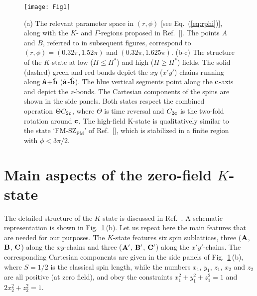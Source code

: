 \documentclass[prx,aps,groupedaddress,twocolumn]{revtex4-1}
\def\cdbl{\color{darkblue}}
\begin{document}
\begin{figure}[!t]
\texttt{[image: Fig1]}
\vspace*{-0.25cm}
\caption{
(a) The relevant parameter space in $(r,\phi)$ [see Eq.~(\ref{eq:rphi})], along with the $K$- and $\Gamma$-regions proposed in Ref.~[]. 
%
The points $A$ and $B$, referred to in subsequent figures, correspond to $(r,\phi)\!=\!(0.32\pi,1.52\pi)$ and $(0.32\pi,1.625\pi)$. 
%
(b-c) The structure of the $K$-state at low ($H\!\le\!H^\ast$) and high ($H\!\ge\!H^\ast$) fields. The solid (dashed) green and red bonds depict the $xy$ ($x'y'$) chains running along $\hat{{\bf a}}$+$\hat{{\bf b}}$ ($\hat{{\bf a}}$-$\hat{{\bf b}}$). The blue vertical segments point along the ${\bf c}$-axis and depict the $z$-bonds.
%
The Cartesian components of the spins are shown in the side panels. 
%
Both states respect the combined operation $\Theta C_{2{\bf c}}$, where $\Theta$ is time reversal and $C_{2{\bf c}}$ is the two-fold rotation around ${\bf c}$. 
%
The high-field K-state is qualitatively similar to the state `FM-SZ$_{\text{FM}}$' of Ref.~[], which is stabilized in a finite region with $\phi\!<\!3\pi/2$.
}
\label{fig:PT}
\end{figure}  





\vspace*{-0.25cm} 
\section{Main aspects of the zero-field $K$-state}
\vspace*{-0.3cm}
The detailed structure of the $K$-state is discussed in Ref.~\cite{Sam2018}.  A schematic representation is shown in Fig.~\ref{fig:PT}\,(b). 
%
Let us repeat here the main features that are needed for our purposes.
%
The $K$-state features six spin sublattices, three (${\bf A}$, ${\bf B}$, ${\bf C}$) along the $xy$-chains and three (${\bf A}'$, ${\bf B}'$, ${\bf C}'$) along the $x'y'$-chains. The corresponding Cartesian components are given in the side panels of Fig.~\ref{fig:PT}\,(b), where $S=1/2$ is the classical spin length, while the numbers $x_1$, $y_1$, $z_1$, $x_2$ and $z_2$ are all positive (at zero field), and obey the constraints $x_1^2+y_1^2+z_1^2\!=\!1$ and $2x_2^2+z_2^2\!=\!1$. 
\end{document}
